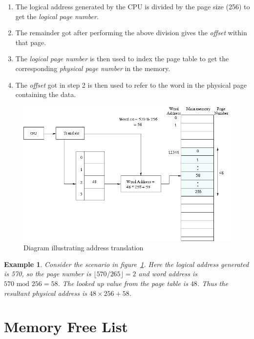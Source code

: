 \documentclass[11pt]{report}
\newtheorem{example}{Example}[section]
\begin{document}
\begin{enumerate}
	\item The logical address generated by the CPU is divided by the page size (256) to get the \emph{logical page number}.
	\item The remainder got after performing the above division gives the \emph{offset} within that page.
	\item The \emph{logical page number} is then used to index the page table to get the corresponding \emph{physical page number} in the memory.
	\item The \emph{offset} got in step 2 is then used to refer to the word in the physical page containing the data.\\
\end{enumerate}

\begin{figure}[h!]
	\centering
	\includegraphics[scale=0.55]{pics/paging_example}
	\caption{Diagram illustrating address translation}
	\label{fig:paging_example}
\end{figure}

\begin{example}
	Consider the scenario in figure~\ref{fig:paging_example}. Here the logical address generated is 570, so the page number is $ \lfloor 570/265 \rfloor = 2$ and word address is $570\mbox{ mod }256 = 58$. The looked up value from the page table is $48$. Thus the resultant physical address is $48 \times 256+58$.
\end{example}
	
\section{Memory Free List}
\label{lbl:memlst}
\end{document}
